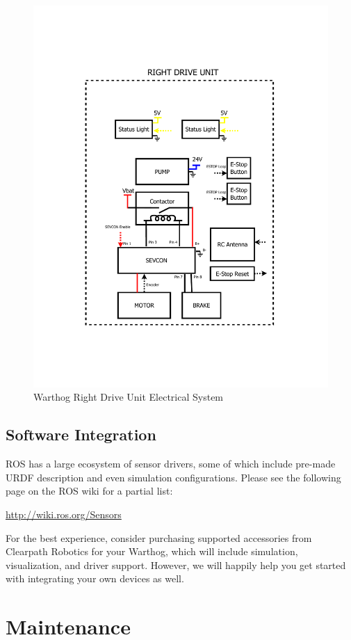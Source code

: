 \documentclass[]{clearpath-latex/clearpath-manual}
\begin{document}
\begin{figure}[!htb]
  \centering
  \includegraphics[width=0.9\linewidth]{elec-right.pdf}
  \caption{Warthog Right Drive Unit Electrical System}
  \label{elec-right}
\end{figure}



\subsection{Software Integration}

ROS has a large ecosystem of sensor drivers, some of which include pre-made URDF description and even simulation configurations.  Please see the following page on the ROS wiki for a partial list:

\url{http://wiki.ros.org/Sensors}

For the best experience, consider purchasing supported accessories from Clearpath Robotics for your Warthog, which will include simulation, visualization, and driver support.  However, we will happily help you get started with integrating your own devices as well.

\section{Maintenance}
\end{document}
